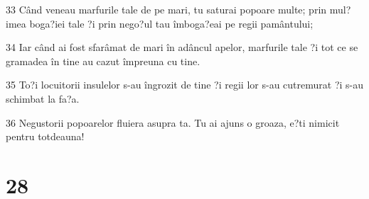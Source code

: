\par 33 Când veneau marfurile tale de pe mari, tu saturai popoare multe; prin mul?imea boga?iei tale ?i prin nego?ul tau îmboga?eai pe regii pamântului;
\par 34 Iar când ai fost sfarâmat de mari în adâncul apelor, marfurile tale ?i tot ce se gramadea în tine au cazut împreuna cu tine.
\par 35 To?i locuitorii insulelor s-au îngrozit de tine ?i regii lor s-au cutremurat ?i s-au schimbat la fa?a.
\par 36 Negustorii popoarelor fluiera asupra ta. Tu ai ajuns o groaza, e?ti nimicit pentru totdeauna!

\chapter{28}


